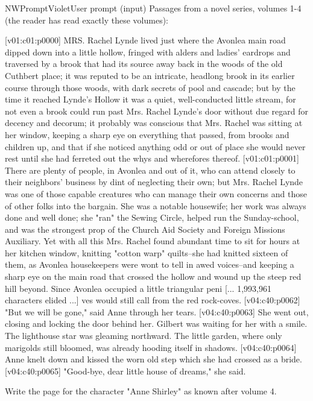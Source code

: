 \begin{nwprompt}{NWPromptViolet}{User prompt (input)}
Passages from a novel series, volumes 1-4 (the reader has read exactly these volumes):

[v01:c01:p0000] MRS. Rachel Lynde lived just where the Avonlea main road dipped down into a little hollow, fringed with alders and ladies' eardrops and traversed by a brook that had its source away back in the woods of the old Cuthbert place; it was reputed to be an intricate, headlong brook in its earlier course through those woods, with dark secrets of pool and cascade; but by the time it reached Lynde's Hollow it was a quiet, well-conducted little stream, for not even a brook could run past Mrs. Rachel Lynde's door without due regard for decency and decorum; it probably was conscious that Mrs. Rachel was sitting at her window, keeping a sharp eye on everything that passed, from brooks and children up, and that if she noticed anything odd or out of place she would never rest until she had ferreted out the whys and wherefores thereof.
[v01:c01:p0001] There are plenty of people, in Avonlea and out of it, who can attend closely to their neighbors' business by dint of neglecting their own; but Mrs. Rachel Lynde was one of those capable creatures who can manage their own concerns and those of other folks into the bargain. She was a notable housewife; her work was always done and well done; she "ran" the Sewing Circle, helped run the Sunday-school, and was the strongest prop of the Church Aid Society and Foreign Missions Auxiliary. Yet with all this Mrs. Rachel found abundant time to sit for hours at her kitchen window, knitting "cotton warp" quilts--she had knitted sixteen of them, as Avonlea housekeepers were wont to tell in awed voices--and keeping a sharp eye on the main road that crossed the hollow and wound up the steep red hill beyond. Since Avonlea occupied a little triangular peni
[... 1,993,961 characters elided ...]
ves would still call from the red rock-coves.
[v04:c40:p0062] "But we will be gone," said Anne through her tears.
[v04:c40:p0063] She went out, closing and locking the door behind her. Gilbert was waiting for her with a smile. The lighthouse star was gleaming northward. The little garden, where only marigolds still bloomed, was already hooding itself in shadows.
[v04:c40:p0064] Anne knelt down and kissed the worn old step which she had crossed as a bride.
[v04:c40:p0065] "Good-bye, dear little house of dreams," she said.

Write the page for the character "Anne Shirley" as known after volume 4.
\end{nwprompt}

